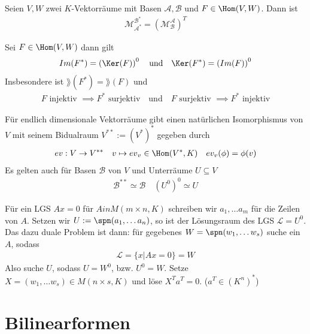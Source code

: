 \begin{satz}{}
    Seien $V, W$ zwei $K$-Vektorräume mit Basen $\mathcal{A}, \mathcal{B}$ und $F \in \Hom(V,W)$. Dann ist
    \begin{align*}
        \mathcal{M}_{\mathcal{A}^*}^{\mathcal{B}^*} = \left(\mathcal{M}_{\mathcal{B}}^{\mathcal{A}}\right)^T
    \end{align*}
\end{satz}

\begin{satz}{}
    Sei $F \in \Hom(V,W)$ dann gilt
    \begin{align*}
        Im(F^*) = \left(\Ker(F)\right)^0 \quad \text{und} \quad \Ker(F^*) = \left(Im(F)\right)^0
    \end{align*}
    Insbesondere ist $\rang(F^*) = \rang(F)$ und
    \begin{align*}
        F \text{ injektiv } \implies F^* \text{ surjektiv} \quad \text{und} \quad F \text{ surjektiv } \implies F^* \text{ injektiv}
    \end{align*}
\end{satz}

Für endlich dimensionale Vektorräume gibt einen natürlichen Isomorphismus von $V$ mit seinem Bidualraum $V^{**} := (V^*)^*$ gegeben durch
\begin{align*}
    ev: V \to  V^{**} \quad v \mapsto {ev}_v \in \Hom(V^*, K) \quad ev_v(\phi) = \phi(v)
\end{align*}
Es gelten auch für Basen $\mathcal{B}$ von $V$ und Unterräume $U \subseteq V$
\begin{align*}
    \mathcal{B}^{**} \simeq \mathcal{B} \quad (U^0)^0 \simeq U
\end{align*}

Für ein LGS $Ax = 0$ für $A in M(m\times n,K)$ schreiben wir $a_1, \ldots a_m$ für die Zeilen von $A$. Setzen wir $U := \spn(a_1, \ldots a_n)$, so ist der Lösungsraum des LGS $\mathcal{L} = U^0$. Das dazu duale Problem ist dann:
für gegebenes $W = \spn(w_1, \ldots w_s)$ suche ein $A$, sodass
\begin{align*}
    \mathcal{L} = \{x \big\vert Ax = 0\} = W
\end{align*}
Also suche $U$, sodass $U = W^0$, bzw. $U^0 = W$. Setze $X = (w_1, \ldots w_s) \in M(n\times s,K)$ und löse $X^T a^T = 0$. ($a^T \in (K^n)^*$)




\section{Bilinearformen}

